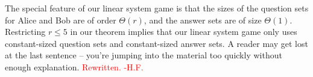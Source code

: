 \documentclass[11pt,letterpaper]{article}
\newcommand{\ket}[1]{|#1\rangle}
\newcommand{\x}{\otimes}
\newcommand{\1}{\mathbb{1}}
\def\carl#1{{\color{blue} #1}}
\newcommand{\hfc}[1]{\textcolor{red}{#1 -H.F.}}
\theoremstyle{definition}
\begin{document}
The special feature of our linear system game is that the sizes
of the question sets for Alice and Bob are of order $\Theta(r)$,
and the answer sets are of size $\Theta(1)$.
Restricting $r \leq 5$ in our theorem implies that our linear system 
game only uses constant-sized question sets and constant-sized answer sets.
\carl{A reader may get lost at the last sentence -- you're jumping into the material too quickly without enough explanation.}
\hfc{Rewritten.}
\end{document}
